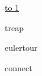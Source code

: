 \documentclass[12pt,a4paper,oneside]{article}
\newcommand{\ProblemLabel}{undefined}
\newcommand{\ProblemTL}{undefined}
\newcommand{\ProblemML}{undefined}
\newcommand{\ProblemName}{undefined}
\def\probl#1#2#3#4#5{
  \renewcommand{\ProblemName}{#2}
  \renewcommand{\ProblemLabel}{#3}
  \renewcommand{\ProblemTL}{#4}
  \renewcommand{\ProblemML}{#5}
  {#2}
}
\begin{document}
\vspace*{-2em}
\tableofcontents

\vspace*{1em}

\noindent \underline{\hbox to 1\textwidth{{ } \hfil{ } \hfil{ } }}

\pagebreak

\probl{2015-07}{treap}{A}{0.5 sec}{256 mb}     %
\probl{2015-03}{eulertour}{B}{0.5 sec}{256 mb} %
\probl{2012-04}{connect}{C}{0.5 sec}{256 mb}   %
\end{document}
